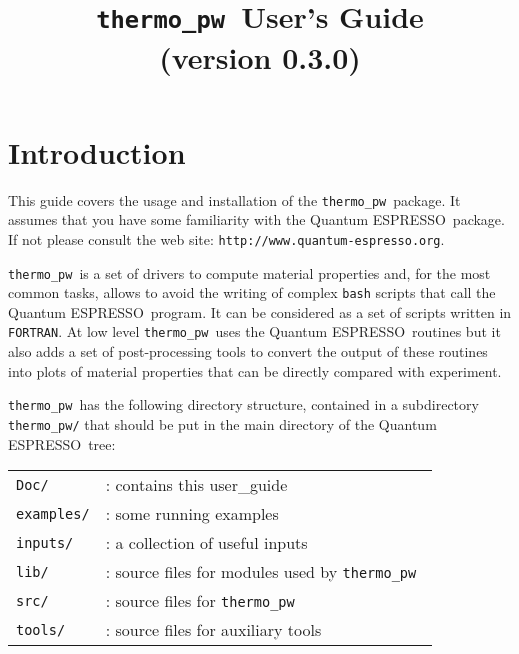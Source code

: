 \documentclass[12pt,a4paper]{article}
\def\version{0.3.0}
\def\qe{{\sc Quantum ESPRESSO}}
\def\thermo{\texttt{thermo\_pw}}
\begin{document}
 
\author{}
\date{}

\def\qeImage{../../Doc/quantum_espresso.pdf}
\def\democritosImage{../../Doc/democritos.pdf}
\def\SissaImage{./sissa.pdf}

\title{
  \vskip 1cm
  \Huge \thermo\ User's Guide \smallskip \\
  \Large (version \version)
}

\maketitle

\tableofcontents

\section{Introduction}

This guide covers the usage and installation of the \thermo\ package. 
It assumes that you have some familiarity with the \qe\ package. 
If not please consult the web site: \texttt{http://www.quantum-espresso.org}.

\thermo\ is a set of drivers to compute material properties
and, for the most common tasks,  allows to avoid the writing of 
complex \texttt{bash} scripts that call the \qe\ program.
It can be considered as a set of scripts written in \texttt{FORTRAN}. 
At low level \thermo\ uses the \qe\ routines but it also adds a
set of post-processing tools to convert the output of these routines
into plots of material properties that can be directly 
compared with experiment.

\thermo\ has the following directory structure, contained in a subdirectory 
\texttt{thermo\_pw/} that should be put in the main directory of the \qe\ tree:

\begin{tabular}{ll}
\texttt{Doc/}      & : contains this user\_guide \\
\texttt{examples/} & : some running examples \\
\texttt{inputs/}   & : a collection of useful inputs \\
\texttt{lib/}      & : source files for modules used by \thermo\ \\
\texttt{src/}      & : source files for \thermo\ \\
\texttt{tools/}    & : source files for auxiliary tools \\
\end{tabular}\\
\end{document}
